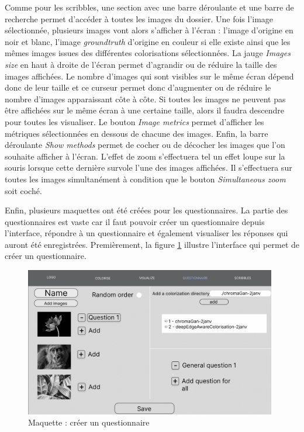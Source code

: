 \documentclass{article}
\begin{document}
Comme pour les scribbles, une section avec une barre déroulante et une barre de recherche permet d'accéder à toutes les images du dossier.
Une fois l'image sélectionnée, plusieurs images vont alors s'afficher à l'écran : l'image d'origine en noir et blanc, l'image \textit{groundtruth}
d'origine en couleur si elle existe ainsi que les mêmes images issues des différentes colorisations sélectionnées.
La jauge \textit{Images size} en haut à droite de l'écran permet d'agrandir ou de réduire la taille des images affichées.
Le nombre d'images qui sont visibles sur le même écran dépend donc de leur taille et ce curseur permet donc d'augmenter ou de réduire le nombre d'images apparaissant côte à côte.
Si toutes les images ne peuvent pas être affichées sur le même écran à une certaine taille, alors il faudra descendre pour toutes les visualiser.
Le bouton \textit{Image metrics} permet d'afficher les métriques sélectionnées en dessous de chacune des images.
Enfin, la barre déroulante \textit{Show methods} permet de cocher ou de décocher les images que l'on souhaite afficher à l'écran.
L'effet de zoom s'effectuera tel un effet loupe sur la souris lorsque cette dernière survole l'une des images affichées. Il s'effectuera sur toutes les images simultanément à condition que 
le bouton \textit{Simultaneous zoom} soit coché.

Enfin, plusieurs maquettes ont été créées pour les questionnaires. La partie des questionnaires est vaste car il faut pouvoir créer un questionnaire
depuis l'interface, répondre à un questionnaire et également visualiser les réponses qui auront été enregistrées.
Premièrement, la figure \ref{fig:questionnaire-creation} illustre l'interface qui permet de créer un questionnaire.

\begin{figure}[!ht]
    \centering
    \includegraphics[width=11cm]{questionnaire-creation.png}
    \caption{Maquette : créer un questionnaire}
    \label{fig:questionnaire-creation}
\end{figure}
\end{document}
